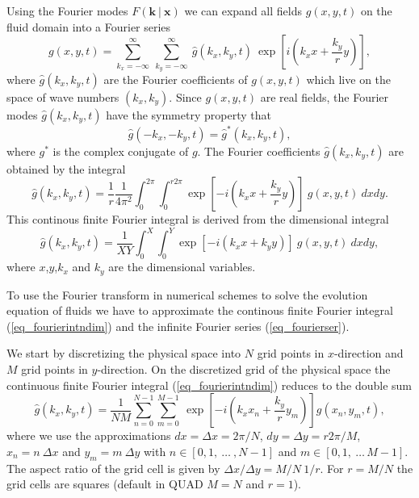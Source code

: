 Using the Fourier modes $F(\mathbf{k} \ | \ \mathbf{x})$ we can expand all 
fields $g(x,y,t)$ on the fluid domain into a Fourier series
\begin{equation} \label{eq_fourierser}
  g(x,y,t) 
   =  
  \sum_{k_{x} = -\infty}^{\infty} \ \sum_{k_{y} = -\infty}^{\infty} \ 
   \hat{g}(k_{x},k_{y},t) \ 
   \exp
   \left[ 
     i \left(k_{x} x + \frac{k_{y}}{r} y \right)
   \right],
\end{equation}
where $\hat{g}(k_{x},k_{y},t)$ are the Fourier coefficients of 
$g(x,y,t)$ which live on the space of wave numbers $(k_{x},k_{y})$.
Since $g(x,y,t)$ are real fields, the Fourier modes $\hat{g}(k_{x},k_{y},t)$
have the symmetry property that
\begin{equation} \label{eq_symfourier}
  \hat{g}(-k_{x},-k_{y},t)  = \hat{g}^{\ast}(k_{x},k_{y},t),
\end{equation}
where $g^{\ast}$ is the complex conjugate of $g$. The Fourier
coefficients $\hat{g}(k_{x},k_{y},t)$ are obtained by the integral
\begin{equation} \label{eq_fourierintndim}
  \hat{g}(k_{x},k_{y},t)
   = 
  \frac{1}{r} \frac{1}{4 \pi^{2}} 
   \int_{0}^{2 \pi} \int_{0}^{r 2 \pi}
   \exp  
   \left[ 
    -i \left(k_{x} x + \frac{k_{y}}{r} y \right)
   \right] \
   g(x,y,t) \ 
dx dy.
\end{equation}
This continous finite Fourier integral is derived from the
dimensional integral 
\begin{equation} \label{eq_fourierint}
  \hat{g}(k_{x},k_{y},t)
   =
  \frac{1}{XY} \int_{0}^{X} \int_{0}^{Y}
   \exp
   \left[
    -i \left(k_{x} x + k_{y} y \right)
   \right] \
   g(x,y,t) \
dx dy,
\end{equation}
where $x$,$y$,$k_{x}$ and $k_{y}$ are the dimensional variables.

To use the Fourier transform in numerical schemes to solve the evolution
equation of fluids we have to approximate the continous finite Fourier integral
(\ref{eq_fourierintndim}) and the infinite Fourier series
(\ref{eq_fourierser}).

We start by discretizing the physical space into $N$ grid points in
$x$-direction and $M$ grid points in $y$-direction. On the discretized
grid of the physical space the continuous finite Fourier integral
(\ref{eq_fourierintndim}) reduces to the double sum
\begin{equation} \label{eq_fourierintprox}
   \hat{g}(k_{x},k_{y},t)
    = 
   \frac{1}{N M} 
   \sum_{n = 0}^{N-1} \sum_{m=0}^{M-1} \
    \exp 
     \left[-i    
      \left(
       k_{x} x_{n} + \frac{k_{y}}{r} y_{m}
      \right)
     \right]
     g(x_{n},y_{m},t),
\end{equation}
where we use the approximations $dx = \Delta x =2\pi/N$, 
$dy = \Delta y = r 2\pi/M $, $x_{n} = n \ \Delta x$ 
and $y_{m} = m \ \Delta y$ with $n \in [0,1,\ \dots \ ,N-1]$ and
$m \in [0,1,\ \dots \,M-1]$. The aspect ratio of the grid cell 
is given by $\Delta x/\Delta y = M/N \ 1/r$. For $r = M/N$ 
the grid cells are squares (default in QUAD $M=N$ and $r=1$).
 
